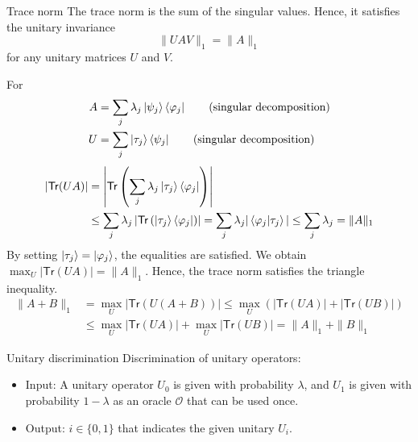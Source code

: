 \documentclass{beamer}
\newcommand{\Tr}{\mathsf{Tr}}
\newcommand\emm[1]{\textcolor{redorange}{{#1}}}
\begin{document}
\begin{frame}{Trace norm}
\footnotesize
The trace norm is the sum of the singular values.
Hence, it satisfies the \emm{unitary invariance}
\begin{equation*}
\|UAV\|_1=\|A\|_1
\end{equation*}
for any unitary matrices $U$ and $V$.

For
\begin{align*}
A &= \sum_j \lambda_j \ket{\psi_j}\bra{\varphi_j}\qquad\text{(singular decomposition)}\\
U &= \sum_j \ket{\tau_j}\bra{\psi_j}\qquad\text{(singular decomposition)}
\end{align*}
\begin{align*}
\left|\Tr(UA)\right|
&= \left|\Tr\left(\sum_j \lambda_j \ket{\tau_j}\bra{\varphi_j}\right)\right|\\
&\le \sum_j \lambda_j \left|\Tr\left(\ket{\tau_j}\bra{\varphi_j}\right)\right|
= \sum_j \lambda_j |\braket{\varphi_j|\tau_j}|
\le \sum_j \lambda_j = \|A\|_1
\end{align*}
By setting $\ket{\tau_j}=\ket{\varphi_j}$, the equalities are satisfied. We obtain \emm{$\max_U|\Tr(UA)| = \|A\|_1$}.
Hence, the trace norm satisfies \emm{the triangle inequality}.
\begin{align*}
\|A+B\|_1 &= \max_U|\Tr(U(A+B))|
\le \max_U(|\Tr(UA)| + |\Tr(UB)|)\\
&\le \max_U|\Tr(UA)| + \max_U|\Tr(UB)|
=\|A\|_1+\|B\|_1
\end{align*}
\end{frame}

\begin{frame}{Unitary discrimination}
Discrimination of \emm{unitary operators}:

\vspace{2em}
\begin{itemize}
\setlength{\itemsep}{2em}
\item Input: A \emm{unitary operator} $U_0$ is given with probability $\lambda$, and $U_1$ is given with probability $1-\lambda$ as an oracle $\mathcal{O}$ that can be used once.
\item Output: $i\in\{0,1\}$ that indicates the given unitary $U_i$.
\end{itemize}
\end{frame}
\end{document}
